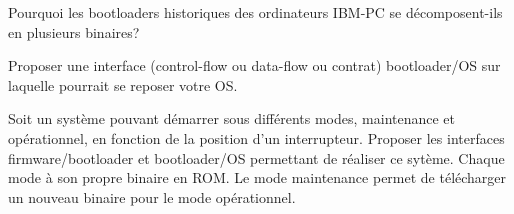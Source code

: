 \begin{questions}
\begin{parts}
\begin{subparts}
    \subpart[1] Pourquoi les bootloaders historiques des ordinateurs IBM-PC se décomposent-ils en plusieurs binaires?

    \subpart[2] Proposer une interface (control-flow ou data-flow ou contrat) bootloader/OS sur laquelle pourrait se reposer votre OS.
  \end{subparts}

  \bonuspart[1]
Soit un système pouvant démarrer sous différents modes, maintenance et opérationnel, en fonction de la position d'un interrupteur. Proposer les interfaces firmware/bootloader et bootloader/OS permettant de réaliser ce sytème. Chaque mode à son propre binaire en ROM. Le mode maintenance permet de télécharger un nouveau binaire pour le mode opérationnel.
\end{parts}

%
%


%
%

\end{questions}
